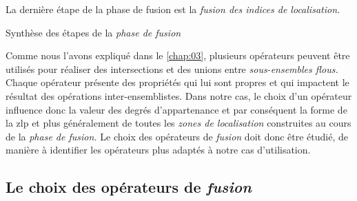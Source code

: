 La dernière étape de la phase de fusion est la \emph{fusion des
  indices de localisation.}

\begin{table}
  \centering
   
   \caption{Synthèse des étapes de la \emph{phase de fusion}}
  \label{tab:comparaison_etapes_fusion}
\end{table}

Comme nous l'avons expliqué dans le \autoref{chap:03}, plusieurs
opérateurs peuvent être utilisés pour réaliser des intersections et
des unions entre \emph{sous-ensembles flous.} Chaque opérateur
présente des propriétés qui lui sont propres et qui impactent le
résultat des opérations inter-ensemblistes. Dans notre cas, le choix
d'un opérateur influence donc la valeur des degrés d'appartenance et
par conséquent la forme de la \ac{zlp} et plus généralement de toutes
les \emph{zones de localisation} construites au cours de la
\emph{phase de fusion.} Le choix des opérateurs de \emph{fusion} doit
donc être étudié, de manière à identifier les opérateurs plus adaptés
à notre cas d'utilisation.

\subsection{Le choix des opérateurs de \emph{fusion}}

